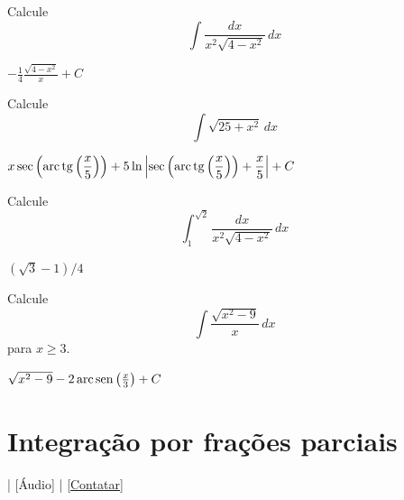 \begin{exer}
  Calcule
  \begin{equation}
    \int\frac{dx}{x^2\sqrt{4-x^2}}\,dx
  \end{equation}
\end{exer}
\begin{resp}
  $-\frac{1}{4}\frac{\sqrt{4-x^2}}{x} + C$
\end{resp}

\begin{exer}
  Calcule
  \begin{equation}
    \int\sqrt{25+x^2}\,dx
  \end{equation}
\end{exer}
\begin{resp}
  $\displaystyle x\sec\left(\operatorname{arc}\operatorname{tg}\left(\frac{x}{5}\right)\right) + 5\ln\left|\sec\left(\operatorname{arc}\operatorname{tg}\left(\frac{x}{5}\right)\right) + \frac{x}{5}\right| + C$
\end{resp}

\begin{exer}
  Calcule
  \begin{equation}
    \int_1^{\sqrt{2}}\frac{dx}{x^2\sqrt{4-x^2}}\,dx
  \end{equation}
\end{exer}
\begin{resp}
  $(\sqrt{3}-1)/4$
\end{resp}

\begin{exer}
  Calcule
  \begin{equation}
    \int\frac{\sqrt{x^2-9}}{x}\,dx
  \end{equation}
  para $x \geq 3$.
\end{exer}
\begin{resp}
  $\sqrt{x^2-9} - 2\operatorname{arc}\operatorname{sen}\left(\frac{x}{3}\right) + C$
\end{resp}

\section{Integração por frações parciais}\label{cap_int_sec_frapar}

\begin{flushright}
  [Vídeo] | [Áudio] | \href{https://phkonzen.github.io/notas/contato.html}{[Contatar]}
\end{flushright}

